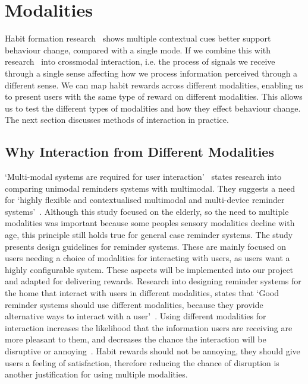 
\newpage

\section{Modalities}
Habit formation research~\cite{article_understanding_use_contextual_cues_design_impl} shows multiple contextual cues better support behaviour change, compared with a single mode.
If we combine this with research~\cite{article_natural_cross_modal_mappings} into crossmodal interaction,
i.e. the process of signals we receive through a single sense affecting how we process information perceived through a different sense.
We can map habit rewards across different modalities, enabling us to present users with the same type of reward on different modalities.
This allows us to test the different types of modalities and how they effect behaviour change.
The next section discusses methods of interaction in practice.

\subsection{Why Interaction from Different Modalities}
`Multi-modal systems are required for user interaction'~\cite{article_user_centred_multimodal_reminders} states research into comparing unimodal reminders systems with multimodal.
They suggests a need for `highly flexible and contextualised multimodal and multi-device reminder systems'~\cite{article_user_centred_multimodal_reminders}.
Although this study focused on the elderly, so the need to multiple modalities was important because some peoples sensory modalities decline with age,
this principle still holds true for general case reminder systems. The study presents design guidelines for reminder systems.
These are mainly focused on users needing a choice of modalities for interacting with users, as users want a highly configurable system.
These aspects will be implemented into our project and adapted for delivering rewards.\newline
\newline
Research into designing reminder systems for the home that interact with users in different modalities, states that
`Good reminder systems should use different modalities, because they provide alternative ways to interact with a user'~\cite{article_designing_multimodal_reminders_for_home}.
Using different modalities for interaction increases the likelihood that the information users are receiving are more pleasant to them,
and decreases the chance the interaction will be disruptive or annoying~\cite{article_designing_multimodal_reminders_for_home}.
Habit rewards should not be annoying, they should give users a feeling of satisfaction, therefore reducing the chance of disruption is another justification for using multiple modalities.

